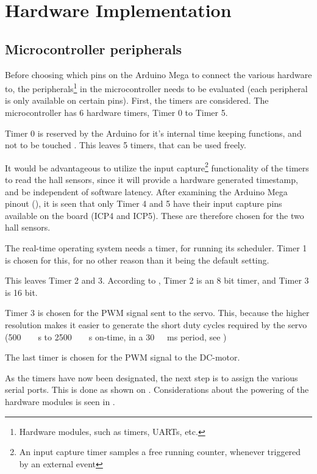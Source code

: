 \section{Hardware Implementation}
\subsection{Microcontroller peripherals}
Before choosing which pins on the Arduino Mega to connect the various hardware to, the peripherals\footnote{Hardware modules, such as timers, UARTs, etc.} in the microcontroller needs to be evaluated (each peripheral is only available on certain pins). First, the timers are considered. The microcontroller has 6 hardware timers, Timer 0 to Timer 5.

Timer 0 is reserved by the Arduino for it's internal time keeping functions, and not to be touched \cite{ArduinoPWM}. This leaves 5 timers, that can be used freely.

It would be advantageous to utilize the input capture\footnote{An input capture timer samples a free running counter, whenever triggered by  an external event} functionality of the timers to read the hall sensors, since it will provide a hardware generated timestamp, and be independent of software latency. After examining the Arduino Mega pinout (), it is seen that only Timer 4 and 5 have their input capture pins available on the board (ICP4 and ICP5). These are therefore chosen for the two hall sensors.
   
The real-time operating system needs a timer, for running its scheduler. Timer 1 is chosen for this, for no other reason than it being the default setting.

This leaves Timer 2 and 3. According to \cite{Atmega}, Timer 2 is an 8 bit timer, and Timer 3 is 16 bit. 

Timer 3 is chosen for the PWM signal sent to the servo. This, because the higher resolution makes it easier to generate the short duty cycles required by the servo (\si{500\ \mu s} to \si{2500\ \mu s} on-time, in a \si{30\ ms} period, see )

The last timer is chosen for the PWM signal to the DC-motor.

As the timers have now been designated, the next step is to assign the various serial ports. This is done as shown on . Considerations about the powering of the hardware modules is seen in .	


